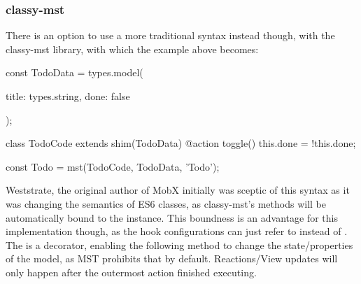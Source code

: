 \subsubsection*{classy-mst}
There is an option to use a more traditional syntax instead
  though, with the classy-mst library, with
  which the example above becomes\cite*{noauthor_classy-mst:_2018}:
\begin{typescript}
const TodoData = types.model({
	title: types.string,
	done: false

});

class TodoCode extends shim(TodoData) {
	@action
	toggle() {
		this.done = !this.done;
	}
}

const Todo = mst(TodoCode, TodoData, 'Todo');
\end{typescript}
 Weststrate, the original author of MobX initially was sceptic of this
 syntax\cite*{noauthor_alternative_nodate} as it was changing the semantics of
 ES6 classes, as classy-mst's methods will be automatically bound to the
 instance. This boundness is an advantage for this implementation though, as the
 hook configurations can just refer to  instead of .
The  is a decorator, enabling the following method to change the
state/properties of the model, as MST prohibits that by default. Reactions/View
updates will only happen after the outermost action finished executing.
